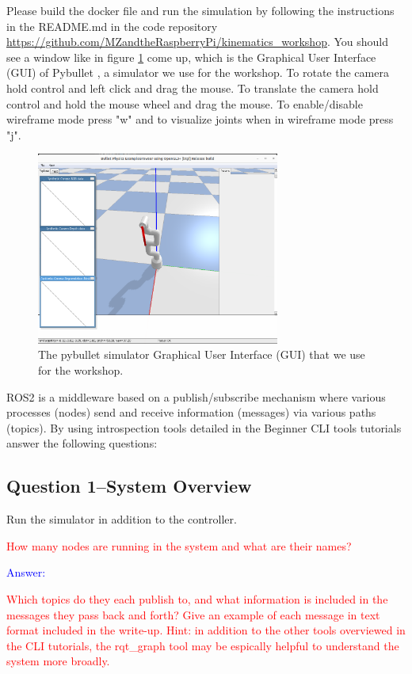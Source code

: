 \documentclass[11pt,a4paper]{article}
\begin{document}
Please build the docker file and run the simulation by following the instructions in the README.md in the code repository \url{https://github.com/MZandtheRaspberryPi/kinematics_workshop}. You should see a window like in figure \ref{fig:pybullet} come up, which is the Graphical User Interface (GUI) of Pybullet \cite{coumans2016pybullet}, a simulator we use for the workshop. To rotate the camera hold control and left click and drag the mouse. To translate the camera hold control and hold the mouse wheel and drag the mouse. To enable/disable wireframe mode press "w" and to visualize joints when in wireframe mode press "j".

\begin{figure}[h]
\includegraphics[width=8cm]{figures/pybullet.png}
\centering
\caption{The pybullet simulator Graphical User Interface (GUI) that we use for the workshop.}
\label{fig:pybullet}
\end{figure}

ROS2 is a middleware based on a publish/subscribe mechanism where various processes (nodes) send and receive information (messages) via various paths (topics). By using introspection tools detailed in the Beginner CLI tools tutorials answer the following questions:

\subsection{Question 1--System Overview}

Run the simulator in addition to the controller. 

\textcolor{red}{How many nodes are running in the system and what are their names? }

\textcolor{blue}{Answer: }

\textcolor{red}{Which topics do they each publish to, and what information is included in the messages they pass back and forth? Give an example of each message in text format included in the write-up. Hint: in addition to the other tools overviewed in the CLI tutorials, the rqt\_graph tool may be espically helpful to understand the system more broadly.}
\end{document}
